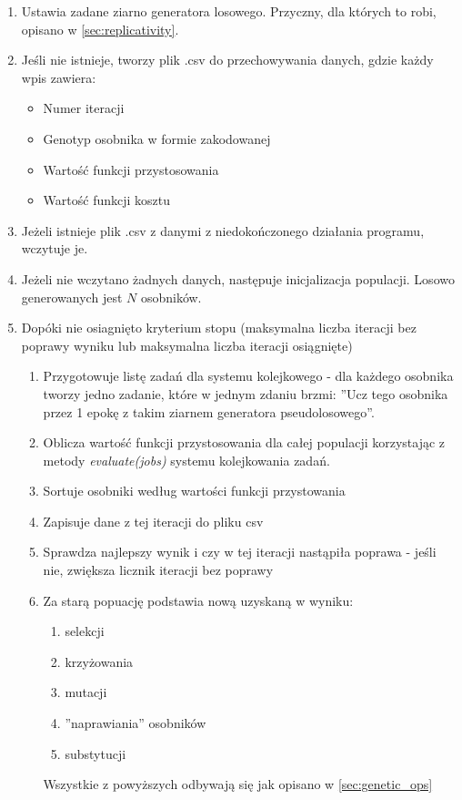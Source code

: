 \begin{enumerate}
  \item Ustawia zadane ziarno generatora losowego. Przyczny, dla których to robi, opisano w \ref{sec:replicativity}.
  \item Jeśli nie istnieje, tworzy plik .csv do przechowywania danych, gdzie każdy wpis zawiera:
  \begin{itemize}
    \item Numer iteracji
    \item Genotyp osobnika w formie zakodowanej
    \item Wartość funkcji przystosowania
    \item Wartość funkcji kosztu
  \end{itemize}
  \item Jeżeli istnieje plik .csv z danymi z niedokończonego działania programu, wczytuje je.
  \item Jeżeli nie wczytano żadnych danych, następuje inicjalizacja populacji. Losowo generowanych jest $N$ osobników.
  \item Dopóki nie osiagnięto kryterium stopu (maksymalna liczba iteracji bez poprawy wyniku lub maksymalna liczba iteracji osiągnięte)
  \begin{enumerate}
    \item Przygotowuje listę zadań dla systemu kolejkowego - dla każdego osobnika tworzy jedno zadanie, które w jednym zdaniu brzmi: ''Ucz tego osobnika przez 1 epokę z takim ziarnem generatora pseudolosowego''.
    \item Oblicza wartość funkcji przystosowania dla całej populacji korzystając z metody \textit{evaluate(jobs)} systemu kolejkowania zadań.
    \item Sortuje osobniki według wartości funkcji przystowania
    \item Zapisuje dane z tej iteracji do pliku csv
    \item Sprawdza najlepszy wynik i czy w tej iteracji nastąpiła poprawa - jeśli nie, zwiększa licznik iteracji bez poprawy
    \item Za starą popuację podstawia nową uzyskaną w wyniku:
    \begin{enumerate}
      \item selekcji
      \item krzyżowania
      \item mutacji
      \item ''naprawiania'' osobników
      \item substytucji
    \end{enumerate}
    Wszystkie z powyższych odbywają się jak opisano w \ref{sec:genetic_ops}
  \end{enumerate}
\end{enumerate}

